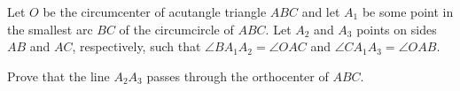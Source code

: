 Let $O$ be the circumcenter of acutangle triangle $ABC$ and let $A_1$ be some point in the smallest arc $BC$ of the circumcircle of $ABC$. Let $A_2$ and $A_3$ points on sides $AB$ and $AC$,  respectively, such that $\angle BA_1A_2 = \angle OAC$ and $\angle CA_1A_3 = \angle OAB$.

Prove that the line $A_2A_3$ passes through the orthocenter of $ABC$.